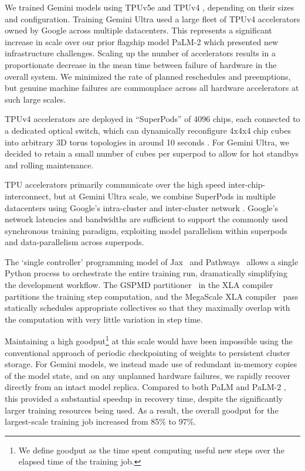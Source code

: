We trained Gemini models using TPUv5e and TPUv4 \cite{tpuv4}, depending on their sizes and configuration. Training Gemini Ultra used a large fleet of TPUv4 accelerators owned by Google across multiple datacenters. This represents a significant increase in scale over our prior flagship model PaLM-2 which presented new infrastructure challenges. Scaling up the number of accelerators results in a proportionate decrease in the mean time between failure of hardware in the overall system. We minimized the rate of planned reschedules and preemptions, but genuine machine failures are commonplace across all hardware accelerators at such large scales.

TPUv4 accelerators are deployed in ``SuperPods'' of 4096 chips, each connected to a dedicated optical switch, which can dynamically reconfigure 4x4x4 chip cubes into arbitrary 3D torus topologies in around 10 seconds \citep{tpuv4}. For Gemini Ultra, we decided to retain a small number of cubes per superpod to allow for hot standbys and rolling maintenance. 

TPU accelerators primarily communicate over the high speed inter-chip-interconnect, but at Gemini Ultra scale, we combine SuperPods in multiple datacenters using Google's intra-cluster and inter-cluster network \cite{jupiter,b4,pony}. Google's network latencies and bandwidths are sufficient to support the commonly used synchronous training paradigm, exploiting model parallelism within superpods and data-parallelism across superpods.

The `single controller' programming model of Jax~\cite{jax} and Pathways~\cite{pathways} allows a single Python process to orchestrate the entire training run, dramatically simplifying the development workflow. The GSPMD partitioner~\cite{gspmd} in the XLA compiler partitions the training step computation, and  the MegaScale XLA compiler~\cite{xla} pass statically schedules appropriate collectives so that they maximally overlap with the computation with very little variation in step time.

Maintaining a high goodput\footnote{We define goodput as the time spent computing useful new steps over the elapsed time of the training job.} at this scale would have been impossible using the conventional approach of periodic checkpointing of weights to persistent cluster storage. For Gemini models, we instead made use of redundant in-memory copies of the model state, and on any unplanned hardware failures, we rapidly recover directly from an intact model replica. Compared to both PaLM and PaLM-2 \cite{palm2}, this provided a substantial speedup in recovery time, despite the significantly larger training resources being used. As a result, the overall goodput for the largest-scale training job increased from 85\% to 97\%.

